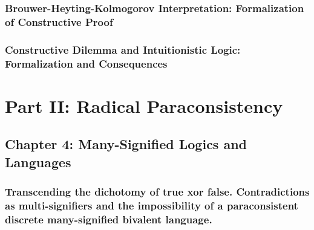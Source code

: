 \hypertarget{brouwer-heyting-kolmogorov-interpretation-formalization-of-constructive-proof}{%
\subsubsection*{\texorpdfstring{\hfill\break
Brouwer-Heyting-Kolmogorov Interpretation: Formalization of Constructive
Proof}{ Brouwer-Heyting-Kolmogorov Interpretation: Formalization of Constructive Proof}}\label{brouwer-heyting-kolmogorov-interpretation-formalization-of-constructive-proof}}

\hypertarget{constructive-dilemma-and-intuitionistic-logic-formalization-and-consequences-1}{%
\subsubsection*{Constructive Dilemma and Intuitionistic Logic:
Formalization and
Consequences}\label{constructive-dilemma-and-intuitionistic-logic-formalization-and-consequences-1}}

\hypertarget{part-ii-radical-paraconsistency}{%
\section*{Part II: Radical
Paraconsistency}\label{part-ii-radical-paraconsistency}}

\hypertarget{chapter-4-many-signified-logics-and-languages}{%
\subsection*{Chapter 4: Many-Signified Logics and
Languages}\label{chapter-4-many-signified-logics-and-languages}}

\hypertarget{transcending-the-dichotomy-of-true-xor-false.-contradictions-as-multi-signifiers-and-the-impossibility-of-a-paraconsistent-discrete-many-signified-bivalent-language.}{%
\subsubsection*{Transcending the dichotomy of true xor false.
Contradictions as multi-signifiers and the impossibility of a
paraconsistent discrete many-signified bivalent
language.}\label{transcending-the-dichotomy-of-true-xor-false.-contradictions-as-multi-signifiers-and-the-impossibility-of-a-paraconsistent-discrete-many-signified-bivalent-language.}}

